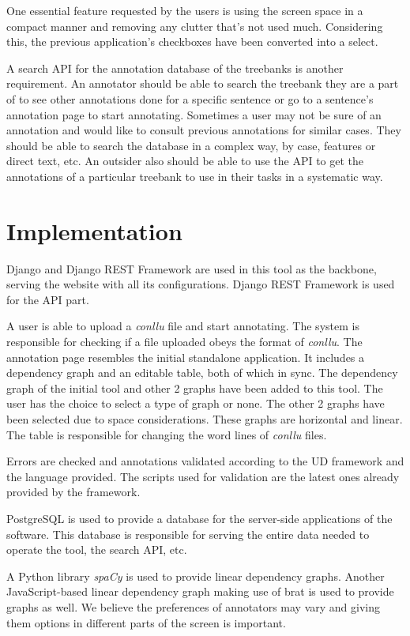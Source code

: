 \documentclass[
]{ceurart}
\begin{document}
One essential feature requested by the users is using the screen space in a compact manner and removing any clutter that's not used much.
Considering this, the previous application's checkboxes have been converted into a select.

A search API for the annotation database of the treebanks is another requirement.
An annotator should be able to search the treebank they are a part of to see other annotations done for a specific sentence or go to a sentence's annotation page to start annotating.
Sometimes a user may not be sure of an annotation and would like to consult previous annotations for similar cases.
They should be able to search the database in a complex way, by case, features or direct text, etc.
An outsider also should be able to use the API to get the annotations of a particular treebank to use in their tasks in a systematic way.

\section{Implementation}

Django\cite{django} and Django REST Framework\cite{drf} are used in this tool as the backbone, serving the website with all its configurations.
Django REST Framework is used for the API part.

A user is able to upload a \textit{conllu} file and start annotating.
The system is responsible for checking if a file uploaded obeys the format of \textit{conllu}.
The annotation page resembles the initial standalone application.
It includes a dependency graph and an editable table, both of which in sync.
The dependency graph of the initial tool and other 2 graphs have been added to this tool.
The user has the choice to select a type of graph or none.
The other 2 graphs have been selected due to space considerations.
These graphs are horizontal and linear.
The table is responsible for changing the word lines of \textit{conllu} files.

Errors are checked and annotations validated according to the UD framework and the language provided.
The scripts used for validation are the latest ones already provided by the framework.\cite{UD-git}

PostgreSQL\cite{psql} is used to provide a database for the server-side applications of the software.
This database is responsible for serving the entire data needed to operate the tool, the search API, etc.

A Python library \textit{spaCy}\cite{spacy} is used to provide linear dependency graphs.
Another JavaScript-based linear dependency graph\cite{spyssalo} making use of brat\cite{brat-vis} is used to provide graphs as well.
We believe the preferences of annotators may vary and giving them options in different parts of the screen is important.
\end{document}
